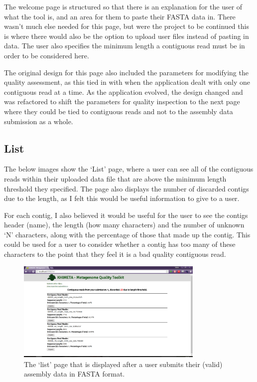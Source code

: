 The welcome page is structured so that there is an explanation for the user of what the tool is, and an area for them to paste their FASTA data in. There wasn't much else needed for this page, but were the project to be continued this is where there would also be the option to upload user files instead of pasting in data. The user also specifies the minimum length a contiguous read must be in order to be considered here.

The original design for this page also included the parameters for modifying the quality assessment, as this tied in with when the application dealt with only one contiguous read at a time. As the application evolved, the design changed and was refactored to shift the parameters for quality inspection to the next page where they could be tied to contiguous reads and not to the assembly data submission as a whole.

\subsection{List}
The below images show the `List' page, where a user can see all of the contiguous reads within their uploaded data file that are above the minimum length threshold they specified. The page also displays the number of discarded contigs due to the length, as I felt this would be useful information to give to a user.

For each contig, I also believed it would be useful for the user to see the contigs header (name), the length (how many characters) and the number of unknown `N' characters, along with the percentage of those that made up the contig. This could be used for a user to consider whether a contig has too many of these characters to the point that they feel it is a bad quality contiguous read.
\begin{figure}[H]
	\centering
\includegraphics[width=0.8\textwidth]{images/ui2}
\caption{The `list' page that is displayed after a user submits their (valid) assembly data in FASTA format.}
\end{figure}

